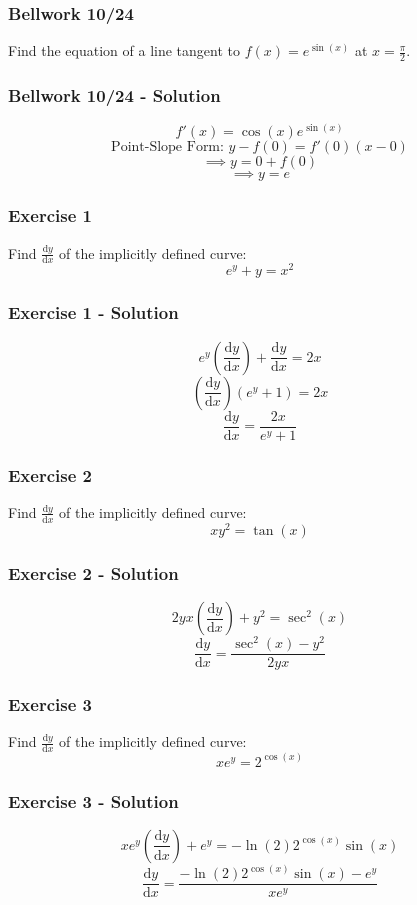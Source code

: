 \documentclass[12pt]{beamer}
\begin{document}
\begin{frame}
	\frametitle{Bellwork 10/24}
	\initclock

	\vfill
	\vfill
	\vfill
	\vfill
	\vfill
	\large
	Find the equation of a line tangent to $f(x)=e^{\sin(x)}$ at $x=\frac{\pi}{2}$.\par
	\vfill
	\vfill
	\vfill
	\vfill
	\vfill
	\vfill
	\vfill

	\small
	\crono
\end{frame}
\begin{frame}
	\frametitle{Bellwork 10/24 - Solution}

	\Large
	\[f'(x)=\cos(x)e^{\sin(x)}\]
	\vfill
	\[\text{Point-Slope Form: }y-f(0)=f'(0)(x-0)\]
	\[\implies y=0+f(0)\]
	\[\implies \boxed{y=e}\]
\end{frame}
\begin{frame}
	\frametitle{Exercise 1}

	\Large
	Find $\frac{\mathrm{d}y}{\mathrm{d}x}$ of the implicitly defined curve:
	\[e^y+y=x^2\]
\end{frame}
\begin{frame}
	\frametitle{Exercise 1 - Solution}

	\Large
	\[e^y\left(\frac{\mathrm{d}y}{\mathrm{d}x}\right)+\frac{\mathrm{d}y}{\mathrm{d}x}=2x\]
	\[\left(\frac{\mathrm{d}y}{\mathrm{d}x}\right)(e^y+1)=2x\]
	\[\boxed{\frac{\mathrm{d}y}{\mathrm{d}x}=\frac{2x}{e^y+1}}\]
\end{frame}
\begin{frame}
	\frametitle{Exercise 2}

	\Large
	Find $\frac{\mathrm{d}y}{\mathrm{d}x}$ of the implicitly defined curve:
	\[xy^2=\tan(x)\]
\end{frame}
\begin{frame}
	\frametitle{Exercise 2 - Solution}

	\Large
	\[2yx\left(\frac{\mathrm{d}y}{\mathrm{d}x}\right)+y^2=\sec^2(x)\]
	\[\boxed{\frac{\mathrm{d}y}{\mathrm{d}x}=\frac{\sec^2(x)-y^2}{2yx}}\]
\end{frame}
\begin{frame}
	\frametitle{Exercise 3}

	\Large
	Find $\frac{\mathrm{d}y}{\mathrm{d}x}$ of the implicitly defined curve:
	\[xe^y=2^{\cos(x)}\]
\end{frame}
\begin{frame}
	\frametitle{Exercise 3 - Solution}

	\Large
	\[xe^y\left(\frac{\mathrm{d}y}{\mathrm{d}x}\right)+e^y=-\ln(2)2^{\cos(x)}\sin(x)\]
	\[\boxed{\frac{\mathrm{d}y}{\mathrm{d}x}=\frac{-\ln(2)2^{\cos(x)}\sin(x)-e^y}{xe^y}}\]
\end{frame}
\end{document}
